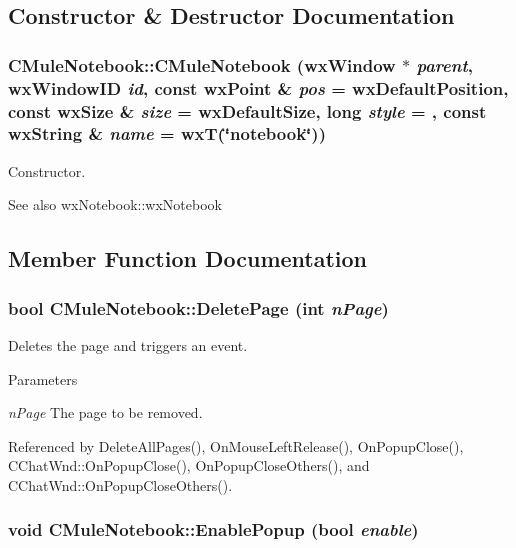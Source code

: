 \subsection{Constructor \& Destructor Documentation}
\subsubsection[{CMuleNotebook}]{\setlength{\rightskip}{0pt plus 5cm}CMuleNotebook::CMuleNotebook (wxWindow $\ast$ {\em parent}, \/  wxWindowID {\em id}, \/  const wxPoint \& {\em pos} = {\ttfamily wxDefaultPosition}, \/  const wxSize \& {\em size} = {\ttfamily wxDefaultSize}, \/  long {\em style} = {}, \/  const wxString \& {\em name} = {\ttfamily wxT(\char`\"{}notebook\char`\"{})})}\label{classCMuleNotebook_ae1d863a261952e42c3008ac4dbb82233}


Constructor. \begin{DoxySeeAlso}{See also}
wxNotebook::wxNotebook 
\end{DoxySeeAlso}


\subsection{Member Function Documentation}
\subsubsection[{DeletePage}]{\setlength{\rightskip}{0pt plus 5cm}bool CMuleNotebook::DeletePage (int {\em nPage})\hspace{0.3cm}{\ttfamily  [virtual]}}\label{classCMuleNotebook_a9e7ea84ef956dd262ab352588884288f}


Deletes the page and triggers an event. 
\begin{DoxyParams}{Parameters}
\item[{\em nPage}]The page to be removed. \end{DoxyParams}


Referenced by DeleteAllPages(), OnMouseLeftRelease(), OnPopupClose(), CChatWnd::OnPopupClose(), OnPopupCloseOthers(), and CChatWnd::OnPopupCloseOthers().
\subsubsection[{EnablePopup}]{\setlength{\rightskip}{0pt plus 5cm}void CMuleNotebook::EnablePopup (bool {\em enable})}\label{classCMuleNotebook_a9ef369f1011479443dbb7389c8d2f2d3}


